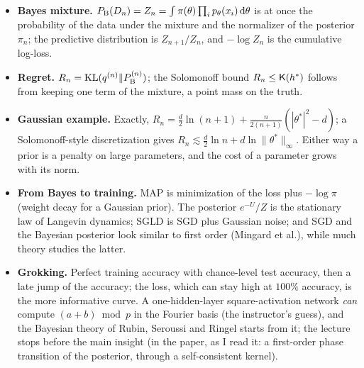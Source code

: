 \begin{takeaways}
\begin{itemize}
  \item \textbf{Bayes mixture.} $P_{\mathrm{B}}(D_n)=Z_n=\int\pi(\theta)\prod_ip_\theta(x_i)\,\mathrm{d}\theta$ is at once the probability of the data under the mixture and the normalizer of the posterior $\pi_n$; the predictive distribution is $Z_{n+1}/Z_n$, and $-\log Z_n$ is the cumulative log-loss.
  \item \textbf{Regret.} $R_n=\operatorname{KL}(q^{(n)}\|P_{\mathrm{B}}^{(n)})$; the Solomonoff bound $R_n\le\mathsf{K}(h^*)$ follows from keeping one term of the mixture, a point mass on the truth.
  \item \textbf{Gaussian example.} Exactly, $R_n=\frac d2\ln(n+1)+\frac n{2(n+1)}(|\theta^*|^2-d)$; a Solomonoff-style discretization gives $R_n\lesssim\frac d2\ln n+d\ln\|\theta^*\|_\infty$. Either way a prior is a penalty on large parameters, and the cost of a parameter grows with its norm.
  \item \textbf{From Bayes to training.} MAP is minimization of the loss plus $-\log\pi$ (weight decay for a Gaussian prior). The posterior $e^{-U}/Z$ is the stationary law of Langevin dynamics; SGLD is SGD plus Gaussian noise; and SGD and the Bayesian posterior look similar to first order (Mingard et al.), while much theory studies the latter.
  \item \textbf{Grokking.} Perfect training accuracy with chance-level test accuracy, then a late jump of the accuracy; the loss, which can stay high at $100\%$ accuracy, is the more informative curve. A one-hidden-layer square-activation network \emph{can} compute $(a+b)\bmod p$ in the Fourier basis (the instructor's guess), and the Bayesian theory of Rubin, Seroussi and Ringel starts from it; the lecture stops before the main insight (in the paper, as I read it: a first-order phase transition of the posterior, through a self-consistent kernel).
\end{itemize}
\end{takeaways}

